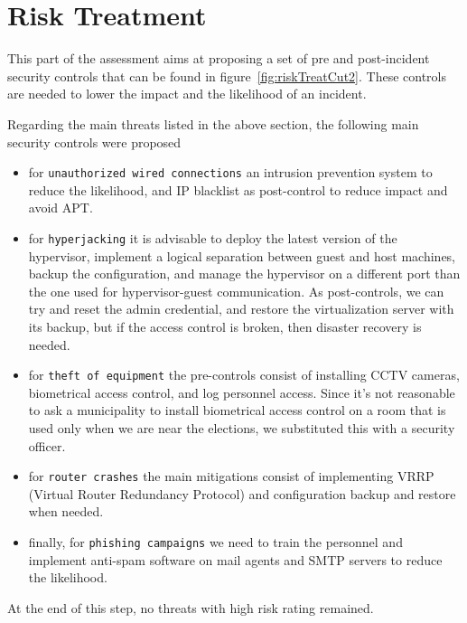 \section*{Risk Treatment}

This part of the assessment aims at proposing a set of pre and post-incident security controls that can be found in figure~\ref{fig:riskTreatCut2}. These controls are needed to lower the impact and the likelihood of an incident.

Regarding the main threats listed in the above section, the following main security controls were proposed

\begin{itemize}
    \item for \texttt{unauthorized wired connections} an intrusion prevention system to reduce the likelihood, and IP blacklist as post-control to reduce impact and avoid APT.
    \item for \texttt{hyperjacking} it is advisable to deploy the latest version of the hypervisor, implement a logical separation between guest and host machines, backup the configuration, and manage the hypervisor on a different port than the one used for hypervisor-guest communication\cite{online:virtualSec}. As post-controls, we can try and reset the admin credential, and restore the virtualization server with its backup, but if the access control is broken, then disaster recovery is needed.
    \item for \texttt{theft of equipment} the pre-controls consist of installing CCTV cameras, biometrical access control, and log personnel access. Since it's not reasonable to ask a municipality to install biometrical access control on a room that is used only when we are near the elections, we substituted this with a security officer.\cite{online:roomSec}
    \item for \texttt{router crashes} the main mitigations consist of implementing VRRP (Virtual Router Redundancy Protocol) \cite{online:VRRP} and configuration backup and restore when needed.
    \item finally, for \texttt{phishing campaigns} we need to train the personnel and implement anti-spam software on mail agents and SMTP servers to reduce the likelihood.
\end{itemize}


At the end of this step, no threats with high risk rating remained.\\

